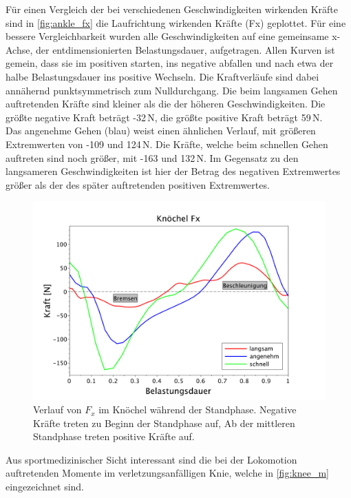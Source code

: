 Für einen Vergleich der bei verschiedenen Geschwindigkeiten wirkenden Kräfte sind in \autoref{fig:ankle_fx} die Laufrichtung wirkenden Kräfte (Fx) geplottet. Für eine bessere Vergleichbarkeit wurden alle Geschwindigkeiten auf eine gemeinsame x-Achse, der entdimensionierten Belastungsdauer, aufgetragen. Allen Kurven ist gemein, dass sie im positiven starten, ins negative abfallen und nach etwa der halbe Belastungsdauer ins positive Wechseln. Die Kraftverläufe sind dabei annähernd punktsymmetrisch zum Nulldurchgang. Die beim langsamen Gehen auftretenden Kräfte sind kleiner als die der höheren Geschwindigkeiten. Die größte negative Kraft beträgt -32\,N, die größte positive Kraft beträgt 59\,N. \\
Das angenehme Gehen (blau) weist einen ähnlichen Verlauf, mit größeren Extremwerten von -109 und 124\,N. Die Kräfte, welche beim schnellen Gehen auftreten sind noch größer, mit -163 und 132\,N. Im Gegensatz zu den langsameren Geschwindigkeiten ist hier der Betrag des negativen Extremwertes größer als der des später auftretenden positiven Extremwertes.\\
\begin{figure}[h!]
	\centering
	\includegraphics[width=0.7\linewidth]{bilder/ergebnisse/ankle_fx_plot.pdf}
	\caption[Bodenreaktionskräfte]{Verlauf von $F_x$ im Knöchel während der Standphase. Negative Kräfte treten zu Beginn der Standphase auf, Ab der mittleren Standphase treten positive Kräfte auf.}
	\label{fig:ankle_fx}
\end{figure}

Aus sportmedizinischer Sicht interessant sind die bei der Lokomotion auftretenden Momente im verletzungsanfälligen Knie, welche in \autoref{fig:knee_m} eingezeichnet sind. 

